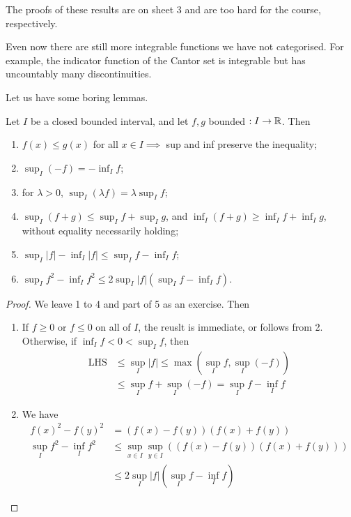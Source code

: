 \documentclass{../template/note}
\begin{document}
    \begin{remark*}
        The proofs of these results are on sheet 3 and are too hard for the course, respectively.
    \end{remark*}
    
    \begin{remark*}
        Even now there are still more integrable functions we have not categorised. For example, the indicator function of the Cantor set is integrable but has uncountably many discontinuities.
    \end{remark*}
    
    Let us have some boring lemmas.

    \begin{lemma}
        Let \(I\) be a closed bounded interval, and let \(f, g\) bounded \(: I \to \mathbb R\). Then
        \begin{enumerate}
            \item \(f(x) \leq g(x)\) for all \(x \in I \implies\) sup and inf preserve the inequality;
            \item \(\sup_I (-f) = -\inf_I f\);
            \item for \(\lambda > 0\), \(\sup_I(\lambda f) = \lambda \sup_I f\);
            \item \(\sup_I(f+g) \leq \sup_I f + \sup_I g\), and \(\inf_I(f+g) \geq \inf_I f + \inf_I g\), without equality necessarily holding;
            \item \(\sup_I |f| - \inf_I |f| \leq \sup_I f - \inf_I f\);
            \item \(\sup_I f^2 - \inf_I f^2 \leq 2 \sup_I |f|\left(\sup_I f - \inf_I f\right)\).
        \end{enumerate}
    \end{lemma}
    

    \begin{proof}
        We leave 1 to 4 and part of 5 as an exercise. Then
        \begin{enumerate}
            \item[5.] If \(f \geq 0\) or \(f \leq 0\) on all of \(I\), the reuslt is immediate, or follows from 2. Otherwise, if \(\inf_I f < 0 < \sup_I f\), then
            \begin{align*}
                \text{LHS} &\leq \sup_I |f| \leq \max(\sup_I f, \sup_I (-f)) \\
                &\leq \sup_I f + \sup_I(-f) = \sup_I f - \inf_I f
            \end{align*}
            \item [6.] We have
            \begin{align*}
                f(x)^2 - f(y)^2 &= (f(x)-f(y))(f(x)+f(y)) \\
                \sup_I f^2 - \inf_I f^2 &\leq \sup_{x \in I} \sup_{y \in I} \left((f(x)-f(y))(f(x)+f(y))\right) \\
                &\leq 2 \sup_I |f| \left(\sup_I f - \inf_I f\right)
            \end{align*}
        \end{enumerate}
    \end{proof}
\end{document}
